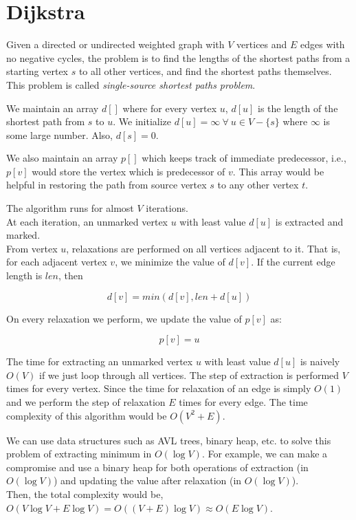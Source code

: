 \documentclass[
]{article}
\author{}
\date{}
\begin{document}
\hypertarget{dijkstra}{%
\section{\texorpdfstring{Dijkstra }{Dijkstra }}\label{dijkstra}}

Given a directed or undirected weighted graph with \(V\) vertices and
\(E\) edges with no negative cycles, the problem is to find the lengths
of the shortest paths from a starting vertex \(s\) to all other
vertices, and find the shortest paths themselves. This problem is called
\emph{single-source shortest paths problem}.

We maintain an array \(d[]\) where for every vertex \(u\), \(d[u]\) is
the length of the shortest path from \(s\) to \(u\). We initialize
\(d[u] = \infty \ \forall \ u \in V - \{s\}\) where \(\infty\) is some
large number. Also, \(d[s] = 0\).

We also maintain an array \(p[]\) which keeps track of immediate
predecessor, i.e., \(p[v]\) would store the vertex which is predecessor
of \(v\). This array would be helpful in restoring the path from source
vertex \(s\) to any other vertex \(t\).

The algorithm runs for almost \(V\) iterations. \\
At each iteration, an unmarked vertex \(u\) with least value \(d[u]\) is
extracted and marked.\\
From vertex \(u\), relaxations are performed on all vertices adjacent to
it. That is, for each adjacent vertex \(v\), we minimize the value of
\(d[v]\). If the current edge length is \(len\), then

\[d[v] = min(d[v], len + d[u])\]

On every relaxation we perform, we update the value of \(p[v]\) as:

\[p[v] = u\]

The time for extracting an unmarked vertex \(u\) with least value
\(d[u]\) is naively \(O(V)\) if we just loop through all vertices. The
step of extraction is performed \(V\) times for every vertex. Since the
time for relaxation of an edge is simply \(O(1)\) and we perform the
step of relaxation \(E\) times for every edge. The time complexity of
this algorithm would be \(O(V^2 + E)\).

We can use data structures such as AVL trees, binary heap, etc. to solve
this problem of extracting minimum in \(O(\log V)\). For example, we can
make a compromise and use a binary heap for both operations of
extraction (in \(O(\log V)\)) and updating the value after relaxation
(in \(O(\log V)\)). \\
Then, the total complexity would be,\\
\(O(V \log V + E \log V) = O((V + E) \log V) \approx O(E \log V)\).
\end{document}
